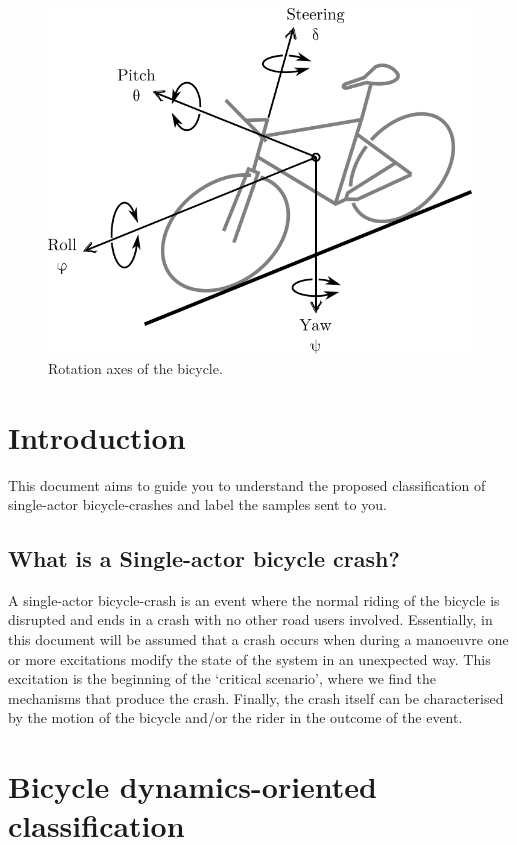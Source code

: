 \documentclass{article}
\begin{document}
\begin{figure}[h]
    \centering
    \includegraphics[scale=1.0]{bike-dof.png}
    \caption{Rotation axes of the bicycle.}
    \label{fig: bike-dof}
\end{figure}


\section{Introduction}

This document aims to guide you to understand the proposed classification \cite{Jac04} of single-actor bicycle-crashes and label the samples sent to you.

\subsection{What is a Single-actor bicycle crash?}

A single-actor bicycle-crash is an event where the normal riding of the bicycle is disrupted and ends in a crash with no other road users involved.
%
Essentially, in this document will be assumed that a crash occurs when during a manoeuvre one or more excitations modify the state of the system in an unexpected way.
%
This excitation is the beginning of the `critical scenario', where we find the mechanisms that produce the crash.
%
Finally, the crash itself can be characterised by the motion of the bicycle and/or the rider in the outcome of the event.

\section{Bicycle dynamics-oriented classification}
\end{document}
